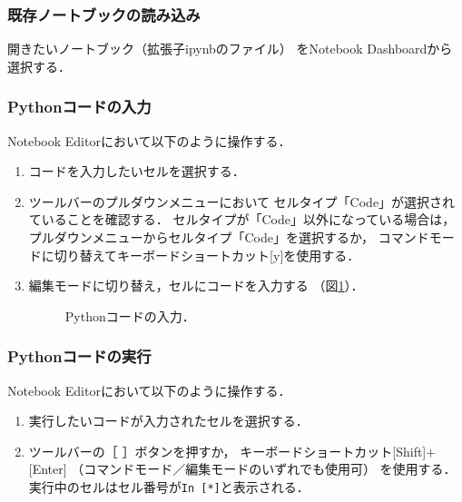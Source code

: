 \subsubsection{既存ノートブックの読み込み}
開きたいノートブック（拡張子ipynbのファイル）
をNotebook Dashboardから選択する．


\subsubsection{Pythonコードの入力}
Notebook Editorにおいて以下のように操作する．
\begin{enumerate}
\item
コードを入力したいセルを選択する．
\item
ツールバーのプルダウンメニューにおいて
セルタイプ「Code」が選択されていることを確認する．
セルタイプが「Code」以外になっている場合は，
プルダウンメニューからセルタイプ「Code」を選択するか，
コマンドモードに切り替えてキーボードショートカット[y]を使用する．
\item
編集モードに切り替え，セルにコードを入力する
（図\ref{fig: Pythonコードの入力}）．

\begin{figure}[htbp]
\centering
\setlength{\fboxsep}{0pt}
\caption{\label{fig: Pythonコードの入力}%
Pythonコードの入力．
}
\end{figure}
\end{enumerate}


\subsubsection{Pythonコードの実行}
Notebook Editorにおいて以下のように操作する．
\begin{enumerate}
\item
実行したいコードが入力されたセルを選択する．
\item
ツールバーの［\,\faStepForward\,］ボタンを押すか，
キーボードショートカット[Shift]+[Enter]
（コマンドモード／編集モードのいずれでも使用可）
を使用する．
実行中のセルはセル番号が\verb|In [*]|と表示される．
\end{enumerate}



